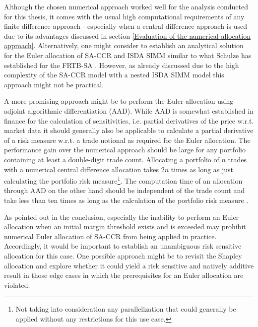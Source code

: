 \documentclass[../Thesis_AHoecherl.tex]{subfiles}
\begin{document}
Although the chosen numerical approach worked well for the analysis conducted for this thesis, it comes with the usual high computational requirements of any finite difference approach - especially when a central difference approach is used due to its advantages discussed in section \ref{Evaluation of the numerical allocation approach}.
Alternatively, one might consider to establish an analytical solution for the Euler allocation of \gls{SA-CCR} and \gls{ISDA SIMM} similar to what Schulze has established for the \gls{FRTB-SA} \cite{schulze2018capital}.
However, as already discussed due to the high complexity of the \gls{SA-CCR} model with a nested \gls{ISDA SIMM} model this approach might not be practical.

A more promising approach might be to perform the Euler allocation using adjoint algorithmic differentiation (\gls{AAD}). 
While \gls{AAD} is somewhat established in finance for the calculation of sensitivities, i.e. partial derivatives of the price w.r.t. market data \cite{giles2006smoking} it should generally also be applicable to calculate a partial derivative of a risk measure w.r.t. a trade notional as required for the Euler allocation.
The performance gain over the numerical approach should be large for any portfolio containing at least a double-digit trade count.
Allocating a portfolio of $n$ trades with a numerical central difference allocation takes $2n$ times as long as just calculating the portfolio risk measure\footnote{Not taking into consideration any parallelization that could generally be applied without any restrictions for this use case.}.
The computation time of an allocation through \gls{AAD} on the other hand should be independent of the trade count and take less than ten times as long as the calculation of the portfolio risk measure \cite{AdaptivAAD}.

As pointed out in the conclusion, especially the inability to perform an Euler allocation when an initial margin threshold exists and is exceeded may prohibit numerical Euler allocation of \gls{SA-CCR} from being applied in practice.
Accordingly, it would be important to establish an unambiguous risk sensitive allocation for this case. One possible approach might be to revisit the Shapley allocation and explore whether it could yield a risk sensitive and natively additive result in those edge cases in which the prerequisites for an Euler allocation are violated.


\end{document}
